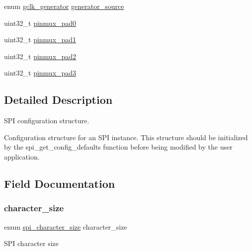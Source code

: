 \begin{DoxyCompactItemize}
\begin{tabbing}
\end{tabbing}\item 
enum \mbox{\hyperlink{group__asfdoc__sam0__system__clock__group_ga1ab9bb87560ad127ed982591b7d67311}{gclk\+\_\+generator}} \mbox{\hyperlink{structspi__config_a2dba667c6d06bff254b7284d45dd02a3}{generator\+\_\+source}}
\item 
uint32\+\_\+t \mbox{\hyperlink{structspi__config_a36c58e420cf9b44d2f6cc8042f81b5d6}{pinmux\+\_\+pad0}}
\item 
uint32\+\_\+t \mbox{\hyperlink{structspi__config_acbc2a9a6d4bee7422a98b6af97e470dc}{pinmux\+\_\+pad1}}
\item 
uint32\+\_\+t \mbox{\hyperlink{structspi__config_ac2961331910efba2dd3a1f865bb34e74}{pinmux\+\_\+pad2}}
\item 
uint32\+\_\+t \mbox{\hyperlink{structspi__config_aa0b3c5c2950e092fe55c7bc2fab47d75}{pinmux\+\_\+pad3}}
\end{DoxyCompactItemize}


\subsection{Detailed Description}
S\+PI configuration structure. 

Configuration structure for an S\+PI instance. This structure should be initialized by the spi\+\_\+get\+\_\+config\+\_\+defaults function before being modified by the user application. 

\subsection{Field Documentation}
\mbox{\label{structspi__config_a7ca9bf5df3e678e26819ff8444041797}} 
\subsubsection{\texorpdfstring{character\_size}{character\_size}}
{\footnotesize\ttfamily enum \mbox{\hyperlink{group__asfdoc__sam0__sercom__spi__group_ga79e8becd0bcea19b99e7eb7fe8a9d6b7}{spi\+\_\+character\+\_\+size}} character\+\_\+size}

S\+PI character size \mbox{\label{structspi__config_acf9451596e18d899f5c9f5ac019e234f}} 

